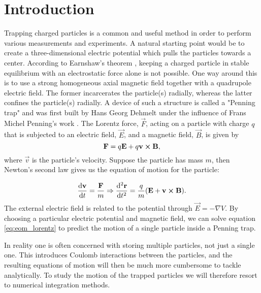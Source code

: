 \section{Introduction}\label{sec:introduction}

Trapping charged particles is a common and useful method in order to perform various measurements and experiments. A natural starting point would be to create a three-dimensional electric potential which pulls the particles towards a center. According to Earnshaw's theorem \citep{GriffithsEarnshaw}, keeping a charged particle in stable equilibrium with an electrostatic force alone is not possible. One way around this is to use a strong homogeneous axial magnetic field together with a quadrupole electric field. The former incarcerates the particle(s) radially, whereas the latter confines the particle(s) radially. A device of such a structure is called a "Penning trap" and was first built by Hans Georg Dehmelt under the influence of Frans Michel Penning's work \citep{Dehmelt1989}. The Lorentz force, $\vec{F}$, acting on a particle with charge $q$ that is subjected to an electric field, $\vec{E}$, and a magnetic field, $\vec{B}$, is given by 
\begin{equation}\label{eq:lorentz_force}
    \mathbf{F} = q\mathbf{E} + q \mathbf{v} \cross \mathbf{B},
\end{equation}
where $\vec{v}$ is the particle's velocity. Suppose the particle has mass $m$, then Newton's second law gives us the equation of motion for the particle:

\begin{equation}\label{eq:eom_lorentz}
 \dv{\mathbf{v}}{t} = \frac{\mathbf{F}}{m}  \Rightarrow \dv[2]{\mathbf{r}}{t}= \frac{q}{m} (\mathbf{E} + \mathbf{v} \cross \mathbf{B} ).
\end{equation}
The external electric field is related to the potential through $\vec{E} = -\nabla V$. By choosing a particular electric potential and magnetic field, we can solve equation \eqref{eq:eom_lorentz} to predict the motion of a single particle inside a Penning trap. 

In reality one is often concerned with storing multiple particles, not just a single one. This introduces Coulomb interactions between the particles, and the resulting equations of motion will then be much more cumbersome to tackle analytically. To study the motion of the trapped particles we will therefore resort to numerical integration methods. 


